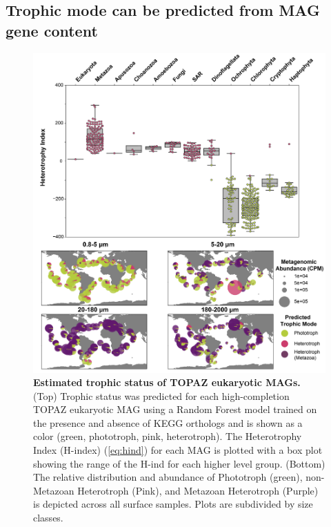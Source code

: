 \documentclass[12pt]{article}
\numberwithin{equation}{section}
\begin{document}
\subsection*{Trophic mode can be predicted from MAG gene content}

\begin{figure}[h!]    
    \centering
    \includegraphics[width = 0.9\columnwidth]{figures/Figure4_Trophic_Mode_v2-01.png}
    \caption{\textbf{Estimated trophic status of TOPAZ eukaryotic MAGs.} (Top) Trophic status was predicted for each high-completion TOPAZ eukaryotic MAG using a Random Forest model trained on the presence and absence of KEGG orthologs and is shown as a color (green, phototroph, pink, heterotroph). The Heterotrophy Index (H-index) (\cref{eq:hind}) for each MAG is plotted with a box plot showing the range of the H-ind for each higher level group. (Bottom) The relative distribution and abundance of Phototroph (green), non-Metazoan Heterotroph (Pink), and Metazoan Heterotroph (Purple) is depicted across all surface samples. Plots are subdivided by size classes. }
    \label{fig:fig4-trophy}
\end{figure}
\end{document}
